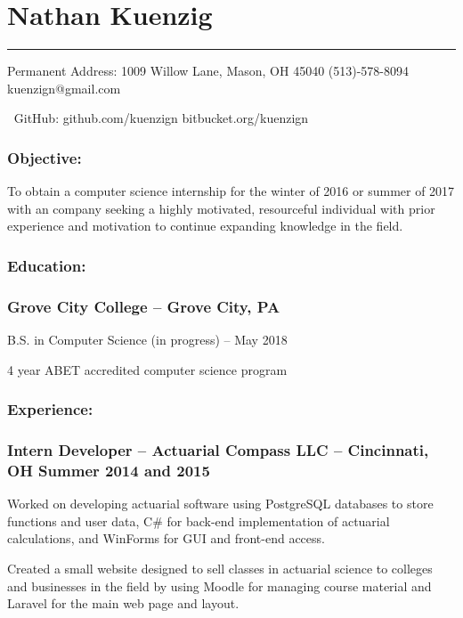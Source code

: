 \documentclass[12pt]{article}
\begin{document}
{
	\centering\section*{\color{head}Nathan Kuenzig}
	\vspace{-7mm}
	\noindent\color{head2}\rule{\textwidth}{1pt}
	
	{\footnotesize {\color{accent}Permanent Address:} 1009 Willow Lane, Mason, OH 45040  (513)-578-8094  kuenzign@gmail.com
	
	{\color{accent}\faGithub $\:$ GitHub:} github.com/kuenzign  bitbucket.org/kuenzign}

}

\subsubsection*{\color{head}Objective:}
\small To obtain a computer science internship for the winter of 2016 or summer of 2017 with an company seeking a highly motivated, resourceful individual with prior experience and motivation to continue expanding knowledge in the field.

\subsubsection*{\color{head}Education:}
\subsubsection*{\textnormal{{\color{accent} Grove City College }\color{head} -- Grove City, PA}}

\noindent\hspace{2.25pc} B.S. in Computer Science (in progress) -- May 2018

\noindent\hspace{2.25pc} 4 year ABET accredited computer science program

\subsubsection*{\color{head}Experience:}
\subsubsection*{\textnormal{{\color{accent} Intern Developer }\color{head} -- Actuarial Compass LLC -- Cincinnati, OH	\hfill Summer 2014 and 2015}}
\begin{compactitem}
	\item Worked on developing actuarial software using PostgreSQL databases to store functions and user data, C\# for back-end implementation of actuarial calculations, and WinForms for GUI and front-end access.
	\item Created a small website designed to sell classes in actuarial science to colleges and businesses in the field by using Moodle for managing course material and Laravel for the main web page and layout.
\end{compactitem}
\end{document}
